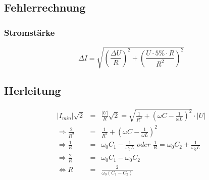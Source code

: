 \subsection{Fehlerrechnung}
\subsubsection{Stromstärke}
\begin{equation}
\Delta I = \sqrt{(\frac{\Delta U}{R})^2+(\frac{U\cdot 5\% \cdot R}{R^2})^2}
\end{equation}
\subsection{Herleitung}
\begin{eqnarray*}
|I_{min}|\sqrt{2} &=& \frac{|U|}{R}\sqrt{2}=\sqrt{\frac{1}{R^2}+(\omega C -\frac{1}{\omega L})^2}\cdot |U|\\
\Rightarrow \frac{2}{R^2} &=& \frac{1}{R^2}+(\omega C -\frac{1}{\omega L})^2\\
\Rightarrow \frac{1}{R} &=& \omega_0C_1-\frac{1}{\omega_0L}\textit{ oder }\frac{1}{R} = \omega_0C_2+\frac{1}{\omega_0L}\\
\Rightarrow \frac{2}{R} &=& \omega_0C_1-\omega_0C_2\\
\iff R &=& \frac{2}{\omega_0(C_1-C_2)}
\end{eqnarray*}
